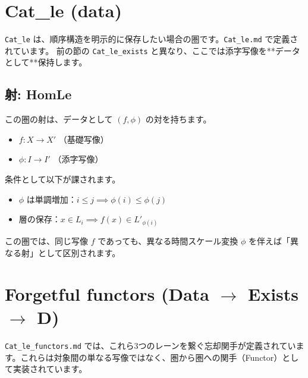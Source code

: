 \documentclass[judge=standard,11pt]{jlreq}
\theoremstyle{definition}
\begin{document}
\section{Cat\_le (data)}

\texttt{Cat\_le} は、順序構造を明示的に保存したい場合の圏です。\texttt{Cat\_le.md} で定義されています。
前の節の \texttt{Cat\_le\_exists} と異なり、ここでは添字写像を**データとして**保持します。

\subsection{射: HomLe}
この圏の射は、データとして $(f, \phi)$ の対を持ちます。
\begin{itemize}
    \item $f: X \to X'$ （基礎写像）
    \item $\phi: I \to I'$ （添字写像）
\end{itemize}

条件として以下が課されます。
\begin{itemize}
    \item $\phi$ は単調増加：$i \le j \implies \phi(i) \le \phi(j)$
    \item 層の保存：$x \in L_i \implies f(x) \in L'_{\phi(i)}$
\end{itemize}

この圏では、同じ写像 $f$ であっても、異なる時間スケール変換 $\phi$ を伴えば「異なる射」として区別されます。

\section{Forgetful functors (Data $\to$ Exists $\to$ D)}

\texttt{Cat\_le\_functors.md} では、これら3つのレーンを繋ぐ忘却関手が定義されています。これらは対象間の単なる写像ではなく、圏から圏への関手（Functor）として実装されています。
\end{document}
